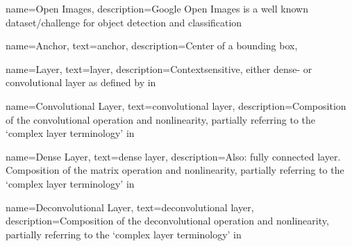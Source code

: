  {
    name={Open Images},
    description={Google Open Images is a well known dataset/challenge for
    object detection and classification}
}

 {
    name={Anchor},
    text={anchor},
    description={Center of a bounding box},
}

 {
    name={Layer},
    text={layer},
    description={Contextsensitive, either dense- or \gls{convolutional layer} 
    as defined by in}}

 {
    name={Convolutional Layer},
    text={convolutional layer},
    description={Composition of the convolutional operation and nonlinearity, 
    partially referring to the `complex layer terminology' 
    in~\cite[341]{Goodfellow.2016}}
}

 {
    name={Dense Layer},
    text={dense layer},
    description={Also: fully connected layer. Composition of the matrix operation and nonlinearity, partially referring to the `complex layer terminology' 
    in~\cite[341]{Goodfellow.2016}} 
}

 {
    name={Deconvolutional Layer},
    text={deconvolutional layer},
    description={Composition of the deconvolutional operation and nonlinearity,
    partially referring to the `complex layer terminology' in~\cite[341]{Goodfellow.2016}}
}
